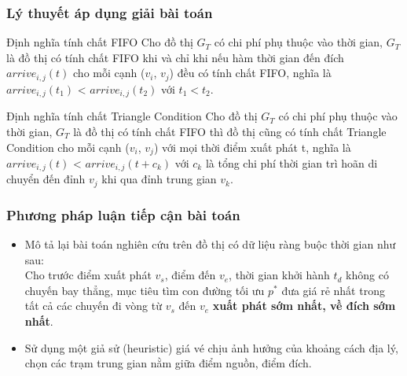 \documentclass{beamer}
\begin{document}

\begin{frame}
\frametitle{Lý thuyết áp dụng giải bài toán}
\begin{block}{Định nghĩa tính chất FIFO}
Cho đồ thị $G_{T}$ có chi phí phụ thuộc vào thời gian, $G_{T}$ là đồ thị có tính chất FIFO khi và chỉ khi nếu hàm thời gian đến đích $arrive _{i,j}(t)$ cho mỗi cạnh ($v_{i}$, $v_{j}$) đều có tính chất FIFO, nghĩa là $arrive_{i,j}(t_{1})$ < $arrive_{i,j}(t_{2})$ với $t_{1} < t_{2}$.\\    
\end{block}
\begin{block}{Định nghĩa tính chất Triangle Condition}
Cho đồ thị $G_{T}$ có chi phí phụ thuộc vào thời gian, $G_{T}$ là đồ thị có tính chất FIFO thì đồ thị cũng có tính chất Triangle Condition cho mỗi cạnh ($v_{i}$, $v_{j}$) với mọi thời điểm xuất phát t, nghĩa là $arrive_{i,j}(t)$ < $arrive_{i,j}(t+c_{k})$ với $c_{k}$ là tổng chi phí thời gian trì hoãn di chuyển đến đỉnh $v_{j}$ khi qua đỉnh trung gian $v_{k}$.\\    
\end{block}
\end{frame}


\begin{frame}
\frametitle{Phương pháp luận tiếp cận bài toán}
\begin{itemize}
\item Mô tả lại bài toán nghiên cứu trên đồ thị có dữ liệu ràng buộc thời gian như sau:\\
Cho trước điểm xuất phát $v_{s}$, điểm đến $v_{e}$, thời gian khởi hành $t_{d}$ không có chuyến bay thẳng, mục tiêu tìm con đường tối ưu $p^*$ đưa giá rẻ nhất trong tất cả các chuyến đi vòng từ $v_{s}$ đến $v_{e}$ \textbf{xuất phát sớm nhất, về đích sớm nhất}.
\item Sử dụng một giả sử (heuristic) giá vé chịu ảnh hưởng của khoảng cách địa lý, chọn các trạm trung gian nằm giữa điểm nguồn, điểm đích.
\end{itemize}
\end{frame}
\end{document}
